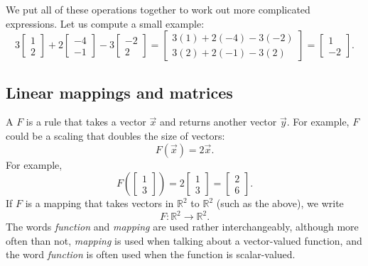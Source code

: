 We put all of these operations together to work out more complicated expressions.
Let us compute a small example:
\begin{equation*}
3
\begin{bmatrix}
1 \\ 2
\end{bmatrix}
+
2
\begin{bmatrix}
-4 \\ -1
\end{bmatrix} 
-
3
\begin{bmatrix}
-2 \\ 2
\end{bmatrix} 
=
\begin{bmatrix}
3(1)+2(-4)-3(-2) \\ 3(2)+2(-1)-3(2)
\end{bmatrix}
=
\begin{bmatrix}
1 \\ -2
\end{bmatrix}
.
\end{equation*}

\subsection{Linear mappings and matrices}

A \emph{}
$F$ is a rule that takes a vector $\vec{x}$ and returns another vector
$\vec{y}$.  For example, $F$ could be a scaling that doubles the size of
vectors:
\begin{equation*}
F(\vec{x}) = 2 \vec{x} .
\end{equation*}
For example,
\begin{equation*}
F
\left( \begin{bmatrix} 1 \\ 3 \end{bmatrix} \right)
=
2
\begin{bmatrix} 1 \\ 3 \end{bmatrix}
=
\begin{bmatrix} 2 \\ 6 \end{bmatrix} .
\end{equation*}
If $F$ is a mapping that takes vectors in
${\mathbb R}^2$ to 
${\mathbb R}^2$ (such as the above), we write
\begin{equation*}
F \colon {\mathbb R}^2 \to {\mathbb R}^2 .
\end{equation*}
The words \emph{function} and \emph{mapping} are used rather interchangeably,
although more often than not, \emph{mapping} is used when talking about a
vector-valued function, and the word \emph{function} is often used when the
function is scalar-valued.

